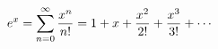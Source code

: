 \documentclass[preview]{standalone}
\begin{document}
\begin{align*}
\special{dvisvgm:raw <g id='unique000'>}e^x = \sum_{n=0}^{\infty}\frac{x^n}{n!}= 1 + x + \frac{x^2}{2!} + \frac{x^3}{3!} + \cdots\special{dvisvgm:raw </g>}
\end{align*}
\end{document}
